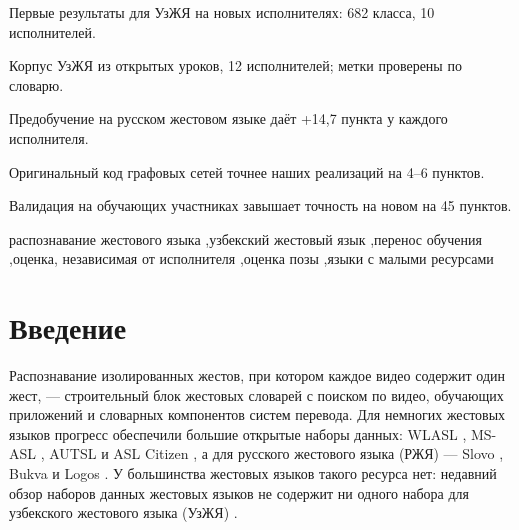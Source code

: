 \documentclass[a4paper,fleqn]{cas-dc}
\begin{document}
\begin{highlights}
\item Первые результаты для УзЖЯ на новых исполнителях: 682 класса, 10 исполнителей.
\item Корпус УзЖЯ из открытых уроков, 12 исполнителей; метки проверены по словарю.
\item Предобучение на русском жестовом языке даёт +14,7 пункта у каждого исполнителя.
\item Оригинальный код графовых сетей точнее наших реализаций на 4–6 пунктов.
\item Валидация на обучающих участниках завышает точность на новом на 45 пунктов.
\end{highlights}
\begin{keywords}
распознавание жестового языка \sep узбекский жестовый язык \sep перенос обучения \sep оценка, независимая от исполнителя \sep оценка позы \sep языки с малыми ресурсами
\end{keywords}
\maketitle
\hypertarget{ux432ux432ux435ux434ux435ux43dux438ux435}{%
\section{Введение}\label{ux432ux432ux435ux434ux435ux43dux438ux435}}

Распознавание изолированных жестов, при котором каждое видео содержит один жест, --- строительный блок жестовых словарей с поиском по видео, обучающих приложений и словарных компонентов систем перевода. Для немногих жестовых языков прогресс обеспечили большие открытые наборы данных: WLASL \cite{2020_li_wlasl}, MS-ASL \cite{2019_joze_msasl}, AUTSL \cite{2020_sincan_autsl} и ASL Citizen \cite{2023_desai_asl_citizen}, а для русского жестового языка (РЖЯ) --- Slovo \cite{2023_kapitanov_slovo}, Bukva \cite{2024_kvanchiani_bukva} и Logos \cite{2025_ovodov_logos}. У большинства жестовых языков такого ресурса нет: недавний обзор наборов данных жестовых языков не содержит ни одного набора для узбекского жестового языка (УзЖЯ) \cite{2026_ni_sign_language_datasets_survey}.
\end{document}
